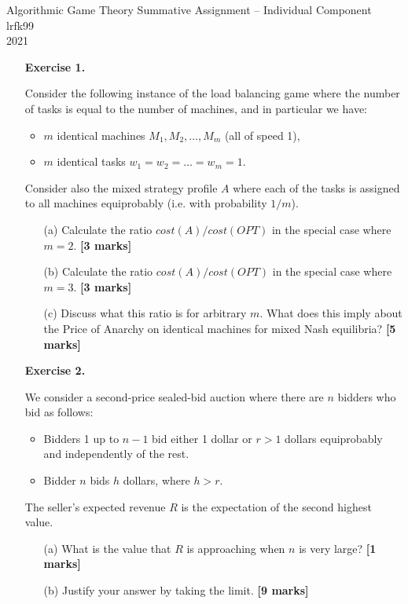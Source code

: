 \documentclass{article}
\begin{document}
\begin{center}
	\LARGE{Algorithmic Game Theory Summative Assignment -- Individual Component}\\[0.1cm]
	\Large{lrfk99}\\[0.1cm]
	2021\\[0.5cm]
\end{center}

\begin{enumerate}
	
	\item[\textbf{Exercise 1.}]   %
	
	Consider the following instance of the load balancing game where the number of tasks is equal to the number of machines, and in particular we have:
	\begin{itemize}
		\item $m$ identical machines $M_1, M_2, \dots, M_m$ (all of speed 1),
		\item $m$ identical tasks $w_1 = w_2 = \dots = w_m = 1$.
	\end{itemize}
	Consider also the mixed strategy profile $A$ where each of the tasks is assigned to all machines equiprobably (i.e. with probability $1/m$). 
	\begin{enumerate}
		\item[(a)] Calculate the ratio $cost(A)/cost(OPT)$ in the special case where $m=2$.  \hfill{\bf [3 marks]}\smallskip
		\item[(b)] Calculate the ratio $cost(A)/cost(OPT)$ in the special case where $m=3$.  \hfill{\bf [3 marks]}\smallskip
		\item[(c)] Discuss what this ratio is for arbitrary $m$. What does this imply about the Price of Anarchy on identical machines for mixed Nash equilibria?  \hfill{\bf [5 marks]}\smallskip
	\end{enumerate}
	\vspace*{0.8cm}
	

	\item[\textbf{Exercise 2.}]  %

	We consider a second-price sealed-bid auction where there are $n$ bidders who bid as follows:
	\begin{itemize}
		\item Bidders 1 up to $n-1$ bid either 1 dollar or $r > 1$ dollars equiprobably and
		independently of the rest.
		\item Bidder $n$ bids $h$ dollars, where $h > r$.
	\end{itemize}
	The seller's expected revenue $R$ is the expectation of the second highest value. 
	\begin{itemize}
		\item[(a)] What is the value that $R$ is approaching when $n$ is very large? \hfill{\bf [1 marks]}\smallskip
		\item[(b)] Justify your answer by taking the limit. \hfill{\bf [9 marks]}\smallskip
	\end{itemize}


\end{enumerate}
\end{document}
